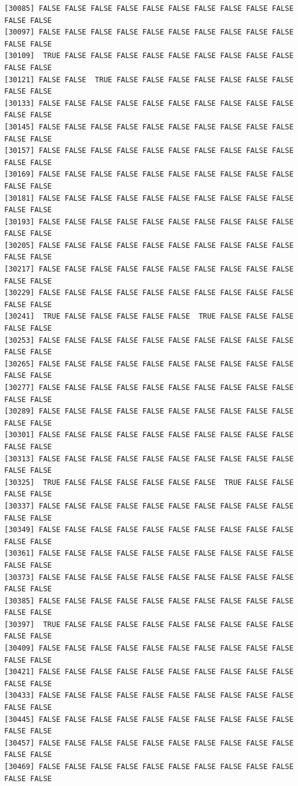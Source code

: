 \documentclass[
  a4paper,
  DIV=11,
  numbers=noendperiod]{scrartcl}
\begin{document}
\begin{verbatim}
[30085] FALSE FALSE FALSE FALSE FALSE FALSE FALSE FALSE FALSE FALSE FALSE FALSE
[30097] FALSE FALSE FALSE FALSE FALSE FALSE FALSE FALSE FALSE FALSE FALSE FALSE
[30109]  TRUE FALSE FALSE FALSE FALSE FALSE FALSE FALSE FALSE FALSE FALSE FALSE
[30121] FALSE FALSE  TRUE FALSE FALSE FALSE FALSE FALSE FALSE FALSE FALSE FALSE
[30133] FALSE FALSE FALSE FALSE FALSE FALSE FALSE FALSE FALSE FALSE FALSE FALSE
[30145] FALSE FALSE FALSE FALSE FALSE FALSE FALSE FALSE FALSE FALSE FALSE FALSE
[30157] FALSE FALSE FALSE FALSE FALSE FALSE FALSE FALSE FALSE FALSE FALSE FALSE
[30169] FALSE FALSE FALSE FALSE FALSE FALSE FALSE FALSE FALSE FALSE FALSE FALSE
[30181] FALSE FALSE FALSE FALSE FALSE FALSE FALSE FALSE FALSE FALSE FALSE FALSE
[30193] FALSE FALSE FALSE FALSE FALSE FALSE FALSE FALSE FALSE FALSE FALSE FALSE
[30205] FALSE FALSE FALSE FALSE FALSE FALSE FALSE FALSE FALSE FALSE FALSE FALSE
[30217] FALSE FALSE FALSE FALSE FALSE FALSE FALSE FALSE FALSE FALSE FALSE FALSE
[30229] FALSE FALSE FALSE FALSE FALSE FALSE FALSE FALSE FALSE FALSE FALSE FALSE
[30241]  TRUE FALSE FALSE FALSE FALSE FALSE  TRUE FALSE FALSE FALSE FALSE FALSE
[30253] FALSE FALSE FALSE FALSE FALSE FALSE FALSE FALSE FALSE FALSE FALSE FALSE
[30265] FALSE FALSE FALSE FALSE FALSE FALSE FALSE FALSE FALSE FALSE FALSE FALSE
[30277] FALSE FALSE FALSE FALSE FALSE FALSE FALSE FALSE FALSE FALSE FALSE FALSE
[30289] FALSE FALSE FALSE FALSE FALSE FALSE FALSE FALSE FALSE FALSE FALSE FALSE
[30301] FALSE FALSE FALSE FALSE FALSE FALSE FALSE FALSE FALSE FALSE FALSE FALSE
[30313] FALSE FALSE FALSE FALSE FALSE FALSE FALSE FALSE FALSE FALSE FALSE FALSE
[30325]  TRUE FALSE FALSE FALSE FALSE FALSE FALSE  TRUE FALSE FALSE FALSE FALSE
[30337] FALSE FALSE FALSE FALSE FALSE FALSE FALSE FALSE FALSE FALSE FALSE FALSE
[30349] FALSE FALSE FALSE FALSE FALSE FALSE FALSE FALSE FALSE FALSE FALSE FALSE
[30361] FALSE FALSE FALSE FALSE FALSE FALSE FALSE FALSE FALSE FALSE FALSE FALSE
[30373] FALSE FALSE FALSE FALSE FALSE FALSE FALSE FALSE FALSE FALSE FALSE FALSE
[30385] FALSE FALSE FALSE FALSE FALSE FALSE FALSE FALSE FALSE FALSE FALSE FALSE
[30397]  TRUE FALSE FALSE FALSE FALSE FALSE FALSE FALSE FALSE FALSE FALSE FALSE
[30409] FALSE FALSE FALSE FALSE FALSE FALSE FALSE FALSE FALSE FALSE FALSE FALSE
[30421] FALSE FALSE FALSE FALSE FALSE FALSE FALSE FALSE FALSE FALSE FALSE FALSE
[30433] FALSE FALSE FALSE FALSE FALSE FALSE FALSE FALSE FALSE FALSE FALSE FALSE
[30445] FALSE FALSE FALSE FALSE FALSE FALSE FALSE FALSE FALSE FALSE FALSE FALSE
[30457] FALSE FALSE FALSE FALSE FALSE FALSE FALSE FALSE FALSE FALSE FALSE FALSE
[30469] FALSE FALSE FALSE FALSE FALSE FALSE FALSE FALSE FALSE FALSE FALSE FALSE

\end{verbatim}
\end{document}
